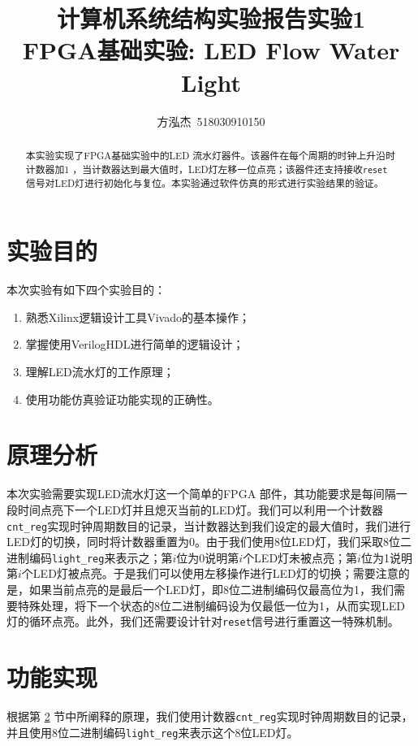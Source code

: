 \documentclass{cumcm}
\title{\textbf{计算机系统结构实验报告\quad 实验1}\\{\Large FPGA基础实验: LED Flow Water Light}}
\author{方泓杰\ 518030910150}
\numberwithin{equation}{section}
\numberwithin{equation}{subsection}
\begin{document}
\maketitle

\begin{abstract}
  本实验实现了FPGA基础实验中的LED 流水灯器件。该器件在每个周期的时钟上升沿时计数器加1 ，当计数器达到最大值时，LED灯左移一位点亮；该器件还支持接收\texttt{reset}信号对LED灯进行初始化与复位。本实验通过软件仿真的形式进行实验结果的验证。
\end{abstract}

\maketitle \tableofcontents
\newpage

\section{实验目的}\label{section1}
本次实验有如下四个实验目的：
\begin{enumerate}
    \item 熟悉Xilinx逻辑设计工具Vivado的基本操作；
    \item 掌握使用VerilogHDL进行简单的逻辑设计；
    \item 理解LED流水灯的工作原理；
    \item 使用功能仿真验证功能实现的正确性。
\end{enumerate}

\section{原理分析}\label{section2}
本次实验需要实现LED流水灯这一个简单的FPGA 部件，其功能要求是每间隔一段时间点亮下一个LED灯并且熄灭当前的LED灯。我们可以利用一个计数器\texttt{cnt\_reg}实现时钟周期数目的记录，当计数器达到我们设定的最大值时，我们进行LED灯的切换，同时将计数器重置为0。由于我们使用8位LED灯，我们采取8位二进制编码\texttt{light\_reg}来表示之；第$i$位为0说明第$i$个LED灯未被点亮；第$i$位为1说明第$i$个LED灯被点亮。于是我们可以使用左移操作进行LED灯的切换；需要注意的是，如果当前点亮的是最后一个LED灯，即8位二进制编码仅最高位为1，我们需要特殊处理，将下一个状态的8位二进制编码设为仅最低一位为1，从而实现LED灯的循环点亮。此外，我们还需要设计针对\texttt{reset}信号进行重置这一特殊机制。

\section{功能实现}\label{section3}
根据第 \ref{section2} 节中所阐释的原理，我们使用计数器\texttt{cnt\_reg}实现时钟周期数目的记录，并且使用8位二进制编码\texttt{light\_reg}来表示这个8位LED灯。
\end{document}
